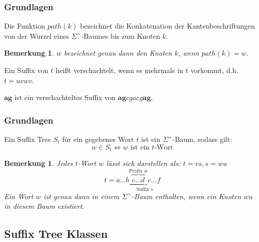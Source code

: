 \documentclass{beamer}
\newtheorem{remark}[theorem]{Bemerkung}
\begin{document}
\begin{frame}
\frametitle{Grundlagen}
\begin{definition}[Pfad]
    Die Funktion $path(k)$ bezeichnet die Konkatenation der Kantenbeschriftungen von der Wurzel eines $\Sigma^+$-Baumes bis zum Knoten $k$.
    \begin{remark}
    $\overline{w}$ bezeichnet genau dann den Knoten $k$, wenn $path(k) = w$.
    \end{remark}
\end{definition}
\begin{definition}
    Ein Suffix von $t$ heißt verschachtelt, wenn es mehrmals in $t$ vorkommt, d.h. $t = uvwv$.
\end{definition}
\begin{example}
    $\boldsymbol{ag}$ ist ein verschachteltes Suffix von $\boldsymbol{ag}cgacg\boldsymbol{ag}$.
\end{example}
\end{frame}

\begin{frame}
\frametitle{Grundlagen}
\begin{definition}
    Ein Suffix Tree $S_t$ für ein gegebenes Wort $t$ ist ein $\Sigma^+$-Baum, sodass gilt:
    $$w \in S_t  \Longleftrightarrow w \text{ ist ein }t\text{-Wort}$$
\end{definition}
\begin{remark}
    Jedes $t$-Wort $w$ lässt sich darstellen als: $t = vs, s = wu$
    $$t = a \dots b \underbrace{\overbrace{c \dots d}^{\text{Präfix }w} e \dots f}_{\text{Suffix }s}$$
    Ein Wort $w$ ist genau dann in einem $\Sigma^+$-Baum enthalten, wenn ein Knoten $\overline{wu}$ in diesem Baum existiert.
\end{remark}
\end{frame}

\subsection{Suffix Tree Klassen}
\end{document}
